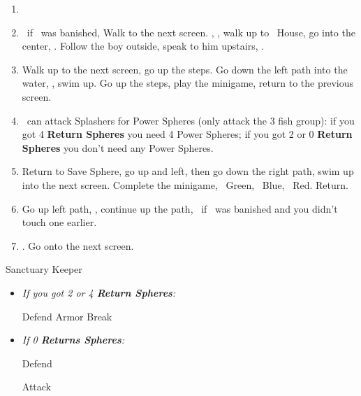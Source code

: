 \begin{enumerate}[resume]
    \item \formation{\tidus}{\kimahri}{\auron}
    \item \save\ if \bahamut\ was banished, Walk to the next screen. \skippablefmv[0:20], \sd, walk up to \tidus\ House, go into the center, \sd. Follow the boy outside, speak to him upstairs, \sd.
    \item Walk up to the next screen, go up the steps. Go down the left path into the water, \sd, swim up. Go up the steps, play the minigame, return to the previous screen.
    \item \tidus\ can attack Splashers for Power Spheres (only attack the 3 fish group): if you got 4 \textbf{Return Spheres} you need 4 Power Spheres; if you got 2 or 0 \textbf{Return Spheres} you don't need any Power Spheres.
    \item Return to Save Sphere, go up and left, then go down the right path, swim up into the next screen. Complete the minigame, \rikku\ Green, \tidus\ Blue, \wakka\ Red. Return.
    \item Go up left path, \sd, continue up the path, \save\ if \bahamut\ was banished and you didn't touch one earlier.
    \item \formation{\tidus}{\yuna}{\wakka}. Go onto the next screen.
\end{enumerate}
\bothvfill
\winvfill
\lossvfill
\begin{battle}[40000]{Sanctuary Keeper}
    \begin{itemize}
        \item \textit{If you got 2 or 4 \textbf{Return Spheres}:}
            \begin{itemize}
                \yunaf Defend
                \tidusf Armor Break
            \end{itemize}
        \item \textit{If 0 \textbf{Returns Spheres}:}
            \begin{itemize}
                \tidusf Defend
            \end{itemize}
        \summon{\bahamut}
        \bahamutf Attack
    \end{itemize}
\end{battle}
